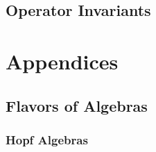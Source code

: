 \subsection{Operator Invariants}
\label{Operator Invariants}
























\newpage
\appendix



\section{Appendices}


\subsection{Flavors of Algebras}
\label{Ribbon Hopf Algebras}


\subsubsection{Hopf Algebras}
\label{Regular Hopf Algebras}


